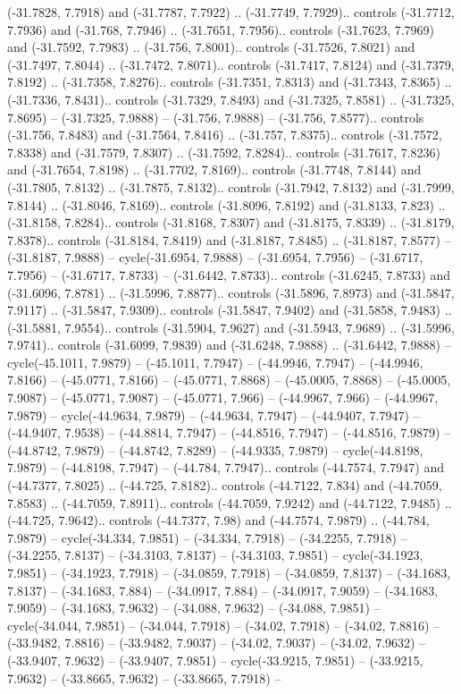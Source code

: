\begin{scope}[shift={(2.5552, 9.9912)}]
\begin{scope}[shift={(48.1654, -14.8546)}]
(-31.7828, 7.7918) and (-31.7787, 7.7922) .. (-31.7749, 7.7929).. controls (-31.7712, 7.7936) and (-31.768, 7.7946) .. (-31.7651, 7.7956).. controls (-31.7623, 7.7969) and (-31.7592, 7.7983) .. (-31.756, 7.8001).. controls (-31.7526, 7.8021) and (-31.7497, 7.8044) .. (-31.7472, 7.8071).. controls (-31.7417, 7.8124) and (-31.7379, 7.8192) .. (-31.7358, 7.8276).. controls (-31.7351, 7.8313) and (-31.7343, 7.8365) .. (-31.7336, 7.8431).. controls (-31.7329, 7.8493) and (-31.7325, 7.8581) .. (-31.7325, 7.8695) -- (-31.7325, 7.9888) -- (-31.756, 7.9888) -- (-31.756, 7.8577).. controls (-31.756, 7.8483) and (-31.7564, 7.8416) .. (-31.757, 7.8375).. controls (-31.7572, 7.8338) and (-31.7579, 7.8307) .. (-31.7592, 7.8284).. controls (-31.7617, 7.8236) and (-31.7654, 7.8198) .. (-31.7702, 7.8169).. controls (-31.7748, 7.8144) and (-31.7805, 7.8132) .. (-31.7875, 7.8132).. controls (-31.7942, 7.8132) and (-31.7999, 7.8144) .. (-31.8046, 7.8169).. controls (-31.8096, 7.8192) and (-31.8133, 7.823) .. (-31.8158, 7.8284).. controls (-31.8168, 7.8307) and (-31.8175, 7.8339) .. (-31.8179, 7.8378).. controls (-31.8184, 7.8419) and (-31.8187, 7.8485) .. (-31.8187, 7.8577) -- (-31.8187, 7.9888) -- cycle(-31.6954, 7.9888) -- (-31.6954, 7.7956) -- (-31.6717, 7.7956) -- (-31.6717, 7.8733) -- (-31.6442, 7.8733).. controls (-31.6245, 7.8733) and (-31.6096, 7.8781) .. (-31.5996, 7.8877).. controls (-31.5896, 7.8973) and (-31.5847, 7.9117) .. (-31.5847, 7.9309).. controls (-31.5847, 7.9402) and (-31.5858, 7.9483) .. (-31.5881, 7.9554).. controls (-31.5904, 7.9627) and (-31.5943, 7.9689) .. (-31.5996, 7.9741).. controls (-31.6099, 7.9839) and (-31.6248, 7.9888) .. (-31.6442, 7.9888) -- cycle(-45.1011, 7.9879) -- (-45.1011, 7.7947) -- (-44.9946, 7.7947) -- (-44.9946, 7.8166) -- (-45.0771, 7.8166) -- (-45.0771, 7.8868) -- (-45.0005, 7.8868) -- (-45.0005, 7.9087) -- (-45.0771, 7.9087) -- (-45.0771, 7.966) -- (-44.9967, 7.966) -- (-44.9967, 7.9879) -- cycle(-44.9634, 7.9879) -- (-44.9634, 7.7947) -- (-44.9407, 7.7947) -- (-44.9407, 7.9538) -- (-44.8814, 7.7947) -- (-44.8516, 7.7947) -- (-44.8516, 7.9879) -- (-44.8742, 7.9879) -- (-44.8742, 7.8289) -- (-44.9335, 7.9879) -- cycle(-44.8198, 7.9879) -- (-44.8198, 7.7947) -- (-44.784, 7.7947).. controls (-44.7574, 7.7947) and (-44.7377, 7.8025) .. (-44.725, 7.8182).. controls (-44.7122, 7.834) and (-44.7059, 7.8583) .. (-44.7059, 7.8911).. controls (-44.7059, 7.9242) and (-44.7122, 7.9485) .. (-44.725, 7.9642).. controls (-44.7377, 7.98) and (-44.7574, 7.9879) .. (-44.784, 7.9879) -- cycle(-34.334, 7.9851) -- (-34.334, 7.7918) -- (-34.2255, 7.7918) -- (-34.2255, 7.8137) -- (-34.3103, 7.8137) -- (-34.3103, 7.9851) -- cycle(-34.1923, 7.9851) -- (-34.1923, 7.7918) -- (-34.0859, 7.7918) -- (-34.0859, 7.8137) -- (-34.1683, 7.8137) -- (-34.1683, 7.884) -- (-34.0917, 7.884) -- (-34.0917, 7.9059) -- (-34.1683, 7.9059) -- (-34.1683, 7.9632) -- (-34.088, 7.9632) -- (-34.088, 7.9851) -- cycle(-34.044, 7.9851) -- (-34.044, 7.7918) -- (-34.02, 7.7918) -- (-34.02, 7.8816) -- (-33.9482, 7.8816) -- (-33.9482, 7.9037) -- (-34.02, 7.9037) -- (-34.02, 7.9632) -- (-33.9407, 7.9632) -- (-33.9407, 7.9851) -- cycle(-33.9215, 7.9851) -- (-33.9215, 7.9632) -- (-33.8665, 7.9632) -- (-33.8665, 7.7918) -- 
\end{scope}
\end{scope}
